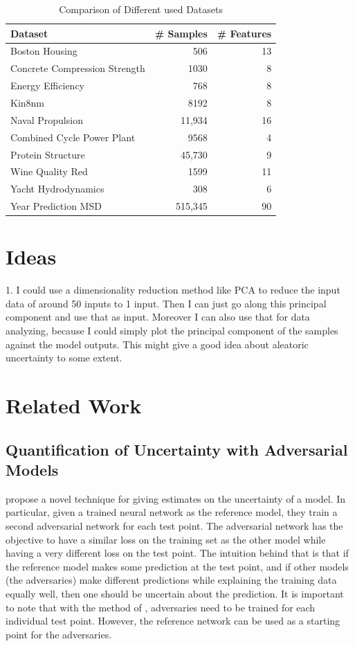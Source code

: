 \documentclass{article}
\begin{document}
\begin{table}
  \caption{Comparison of Different used Datasets}
  \label{tab:dataset_comparison}
  \centering
  \begin{tabular}{lrr}
    \toprule
    Dataset & \# Samples & \# Features \\
    \midrule
    Boston Housing & 506 & 13 \\
    Concrete Compression Strength & 1030 & 8 \\
    Energy Efficiency & 768 & 8 \\
    Kin8nm & 8192 & 8 \\
    Naval Propulsion & 11,934 & 16 \\
    Combined Cycle Power Plant & 9568 & 4 \\
    Protein Structure & 45,730 & 9 \\
    Wine Quality Red & 1599 & 11 \\
    Yacht Hydrodynamics & 308 & 6 \\
    Year Prediction MSD & 515,345 & 90 \\
    \bottomrule
  \end{tabular}
\end{table}



\section{Ideas}
1. I could use a dimensionality reduction method like PCA to reduce the input data of around 50 inputs to 1 input. Then I can just go along this principal component and use that as input. Moreover I can also use that for data analyzing, because I could simply plot the principal component of the samples against the model outputs. This might give a good idea about aleatoric uncertainty to some extent.


\section{Related Work}

\subsection{Quantification of Uncertainty with Adversarial Models}
\cite{schweighofer2023quantification} propose a novel technique for giving estimates on the uncertainty of a model. In particular, given a trained neural network as the reference model, they train a second adversarial network for each test point. The adversarial network has the objective to have a similar loss on the training set as the other model while having a very different loss on the test point. The intuition behind that is that if the reference model makes some prediction at the test point, and if other models (the adversaries) make different predictions while explaining the training data equally well, then one should be uncertain about the prediction. It is important to note that with the method of \cite{schweighofer2023quantification}, adversaries need to be trained for each individual test point. However, the reference network can be used as a starting point for the adversaries. %
\end{document}
